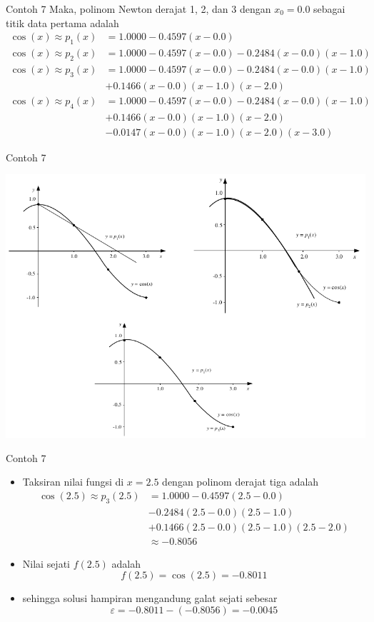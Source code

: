 \documentclass[pdflatex,compress,mathserif]{beamer}
\begin{document}
\begin{frame}{Contoh 7}
	Maka, polinom Newton derajat 1, 2, dan 3 dengan $ x_0 = 0.0 $ sebagai titik data pertama adalah
	\begin{align*}
		\cos(x) \approx p_1(x) &= 1.0000 - 0.4597(x - 0.0) \\
		\cos(x) \approx p_2(x) &= 1.0000 - 0.4597(x - 0.0) - 0.2484(x - 0.0)(x - 1.0) \\
		\cos(x) \approx p_3(x) &= 1.0000 - 0.4597(x - 0.0) - 0.2484(x - 0.0)(x - 1.0) \\
		&+ 0.1466(x - 0.0)(x - 1.0)(x - 2.0) \\
		\cos(x) \approx p_4(x) &= 1.0000 - 0.4597(x - 0.0) - 0.2484(x - 0.0)(x - 1.0) \\
		&+ 0.1466(x - 0.0)(x - 1.0)(x - 2.0) \\
		&-0.0147(x - 0.0)(x - 1.0)(x - 2.0)(x - 3.0)
	\end{align*}
\end{frame}

\begin{frame}{Contoh 7}
	\begin{center}
		\includegraphics[width=0.8\linewidth]{img/img15}
	\end{center}
\end{frame}

\begin{frame}{Contoh 7}
	\begin{itemize}
		\item Taksiran nilai fungsi di $ x = 2.5 $ dengan polinom derajat tiga adalah
		\begin{align*}
			\cos(2.5) \approx p_3(2.5) &= 1.0000 - 0.4597(2.5 - 0.0)\\
			&- 0.2484(2.5 - 0.0)(2.5 - 1.0)\\
			&+ 0.1466(2.5 - 0.0)(2.5 - 1.0)(2.5 - 2.0) \\
			&\approx -0.8056
		\end{align*}
		\item Nilai sejati $ f(2.5) $ adalah
		\[ f(2.5) = \cos(2.5) = -0.8011 \]
		\item sehingga solusi hampiran mengandung galat sejati sebesar
		\[ \varepsilon = -0.8011 - (-0.8056) = -0.0045 \]
	\end{itemize}
\end{frame}
\end{document}
